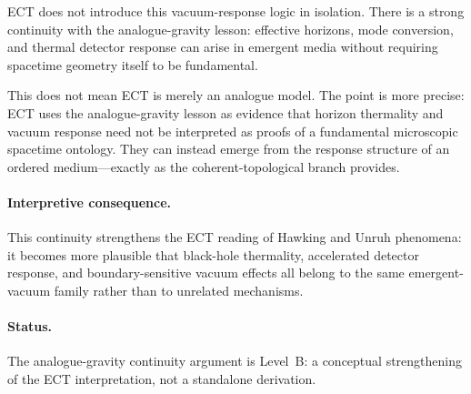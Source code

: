 \documentclass[11pt,a4paper]{article}
\numberwithin{equation}{section}
\begin{document}
ECT does not introduce this vacuum-response logic in isolation.
There is a strong continuity with the analogue-gravity lesson:
effective horizons, mode conversion, and thermal detector response
can arise in emergent media without requiring spacetime geometry
itself to be fundamental.

This does not mean ECT is merely an analogue model.
The point is more precise: ECT uses the analogue-gravity lesson as
evidence that horizon thermality and vacuum response need not be
interpreted as proofs of a fundamental microscopic spacetime
ontology.
They can instead emerge from the response structure of an ordered
medium---exactly as the coherent-topological branch provides.

\paragraph{Interpretive consequence.}
This continuity strengthens the ECT reading of Hawking and Unruh
phenomena: it becomes more plausible that black-hole thermality,
accelerated detector response, and boundary-sensitive vacuum effects
all belong to the same emergent-vacuum family rather than to
unrelated mechanisms.

\paragraph{Status.}
The analogue-gravity continuity argument is Level~B: a conceptual
strengthening of the ECT interpretation, not a standalone derivation.
\end{document}
